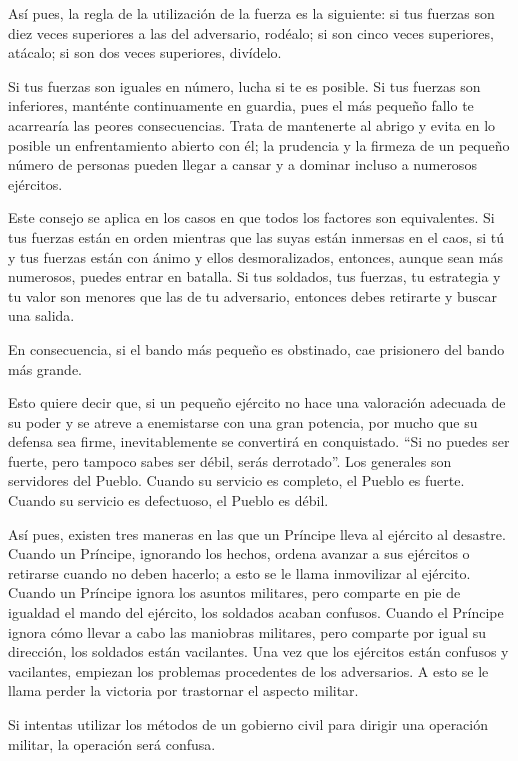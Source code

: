 Así pues, la regla de la utilización de la fuerza es la siguiente: si tus fuerzas son diez veces superiores a las del adversario, rodéalo; si son cinco veces superiores, atácalo; si son dos veces superiores, divídelo.

Si tus fuerzas son iguales en número, lucha si te es posible. Si tus fuerzas son inferiores, manténte continuamente en guardia, pues el más pequeño fallo te acarrearía las peores consecuencias. Trata de mantenerte al abrigo y evita en lo posible un enfrentamiento abierto con él; la prudencia y la firmeza de un pequeño número de personas pueden llegar a cansar y a dominar incluso a numerosos ejércitos.
 
Este consejo se aplica en los casos en que todos los factores son equivalentes. Si tus fuerzas están en orden mientras que las suyas están inmersas en el caos, si tú y tus fuerzas están con ánimo y ellos desmoralizados, entonces, aunque sean más numerosos, puedes entrar en batalla. Si tus soldados, tus fuerzas, tu estrategia y tu valor son menores que las de tu adversario, entonces debes retirarte y buscar una salida.

En consecuencia, si el bando más pequeño es obstinado, cae prisionero del bando más grande.

Esto quiere decir que, si un pequeño ejército no hace una valoración adecuada de su poder y se atreve a enemistarse con una gran potencia, por mucho que su defensa sea firme, inevitablemente se convertirá en conquistado. ``Si no puedes ser fuerte, pero tampoco sabes ser débil, serás derrotado''. Los generales son servidores del Pueblo. Cuando su servicio es completo, el Pueblo es fuerte. Cuando su servicio es defectuoso, el Pueblo es débil.

Así pues, existen tres maneras en las que un Príncipe lleva al ejército al desastre. Cuando un Príncipe, ignorando los hechos, ordena avanzar a sus ejércitos o retirarse cuando no deben hacerlo; a esto se le llama inmovilizar al ejército. Cuando un Príncipe ignora los asuntos militares, pero comparte en pie de igualdad el mando del ejército, los soldados acaban confusos. Cuando el Príncipe ignora cómo llevar a cabo las maniobras militares, pero comparte por igual su dirección, los soldados están vacilantes. Una vez que los ejércitos están confusos y vacilantes, empiezan los problemas procedentes de los adversarios. A esto se le llama perder la victoria por trastornar el aspecto militar.

Si intentas utilizar los métodos de un gobierno civil para dirigir una operación militar, la operación será confusa.

